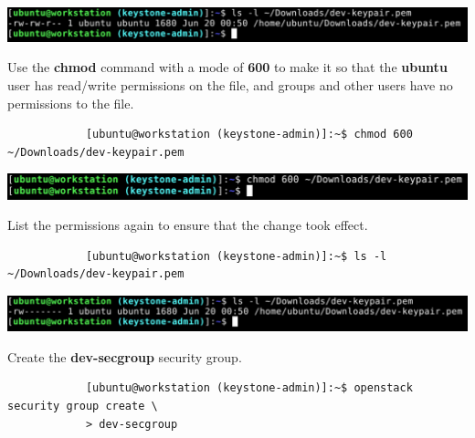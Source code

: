 \documentclass[letterpaper, 12pt]{article}
\begin{document}
\begin{enumerate}
\begin{labstep}
        \begin{center}
            \includegraphics[width=\linewidth]{images/part1/step22.png}
        \end{center}
    \end{labstep}

    \begin{labstep}
        Use the \textbf{chmod} command with a mode of \textbf{600} to make it so that the \textbf{ubuntu} user has read/write permissions on the file, and groups and other users have no permissions to the file.
        \begin{lstlisting}
            [ubuntu@workstation (keystone-admin)]:~$ chmod 600 ~/Downloads/dev-keypair.pem
        \end{lstlisting}

        \begin{center}
            \includegraphics[width=\linewidth]{images/part1/step23.png}
        \end{center}
    \end{labstep}

    \begin{labstep}
        List the permissions again to ensure that the change took effect.
        \begin{lstlisting}
            [ubuntu@workstation (keystone-admin)]:~$ ls -l ~/Downloads/dev-keypair.pem
        \end{lstlisting}

        \begin{center}
            \includegraphics[width=\linewidth]{images/part1/step24.png}
        \end{center}
    \end{labstep}

    \begin{labstep}
        Create the \textbf{dev-secgroup} security group.
        \begin{lstlisting}
            [ubuntu@workstation (keystone-admin)]:~$ openstack security group create \
            > dev-secgroup
        \end{lstlisting}


\end{labstep}
\end{enumerate}
\end{document}
